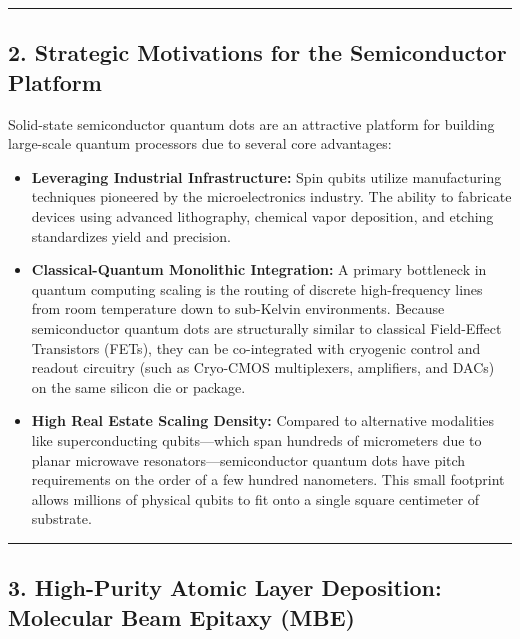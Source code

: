 \documentclass[
]{article}
\providecommand{\tightlist}{%
  \setlength{\itemsep}{0pt}\setlength{\parskip}{0pt}}
\begin{document}
\begin{center}\rule{0.5\linewidth}{0.5pt}\end{center}

\subsection{2. Strategic Motivations for the Semiconductor
Platform}\label{strategic-motivations-for-the-semiconductor-platform}

Solid-state semiconductor quantum dots are an attractive platform for
building large-scale quantum processors due to several core advantages:

\begin{itemize}
\tightlist
\item
  \textbf{Leveraging Industrial Infrastructure:} Spin qubits utilize
  manufacturing techniques pioneered by the microelectronics industry.
  The ability to fabricate devices using advanced lithography, chemical
  vapor deposition, and etching standardizes yield and precision.
\item
  \textbf{Classical-Quantum Monolithic Integration:} A primary
  bottleneck in quantum computing scaling is the routing of discrete
  high-frequency lines from room temperature down to sub-Kelvin
  environments. Because semiconductor quantum dots are structurally
  similar to classical Field-Effect Transistors (FETs), they can be
  co-integrated with cryogenic control and readout circuitry (such as
  Cryo-CMOS multiplexers, amplifiers, and DACs) on the same silicon die
  or package.
\item
  \textbf{High Real Estate Scaling Density:} Compared to alternative
  modalities like superconducting qubits---which span hundreds of
  micrometers due to planar microwave resonators---semiconductor quantum
  dots have pitch requirements on the order of a few hundred nanometers.
  This small footprint allows millions of physical qubits to fit onto a
  single square centimeter of substrate.
\end{itemize}

\begin{center}\rule{0.5\linewidth}{0.5pt}\end{center}

\subsection{3. High-Purity Atomic Layer Deposition: Molecular Beam
Epitaxy
(MBE)}\label{high-purity-atomic-layer-deposition-molecular-beam-epitaxy-mbe}
\end{document}
